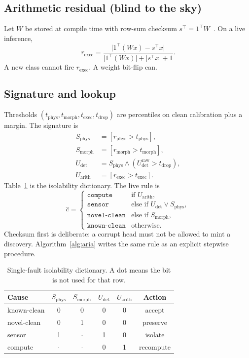 \documentclass[journal]{IEEEtran}
\begin{document}
\subsection{Arithmetic residual (blind to the sky)}
Let $W$ be stored at compile time with row-sum checksum $s^\top=1^\top W$~\cite{ftcnn2020}. On a live inference,
\[
r_{\mathrm{exec}}=\frac{\lvert 1^\top(Wx)-s^\top x\rvert}{\lvert 1^\top(Wx)\rvert+\lvert s^\top x\rvert+1}.
\]
A new class cannot fire $r_{\mathrm{exec}}$. A weight bit-flip can.

\subsection{Signature and lookup}
Thresholds $(t_{\mathrm{phys}},t_{\mathrm{morph}},t_{\mathrm{exec}},t_{\mathrm{drop}})$ are percentiles on clean calibration plus a margin. The signature is
\begin{align*}
S_{\mathrm{phys}} &= [r_{\mathrm{phys}}>t_{\mathrm{phys}}],\\
S_{\mathrm{morph}} &= [r_{\mathrm{morph}}>t_{\mathrm{morph}}],\\
U_{\mathrm{det}} &= S_{\mathrm{phys}}\wedge(U_{\mathrm{det}}^{\mathrm{raw}}>t_{\mathrm{drop}}),\\
U_{\mathrm{arith}} &= [r_{\mathrm{exec}}>t_{\mathrm{exec}}].
\end{align*}
Table~\ref{tab:dict} is the isolability dictionary. The live rule is
\begin{equation}
\hat{c}=\begin{cases}
\texttt{compute} & \text{if }U_{\mathrm{arith}},\\
\texttt{sensor} & \text{else if }U_{\mathrm{det}}\vee S_{\mathrm{phys}},\\
\texttt{novel-clean} & \text{else if }S_{\mathrm{morph}},\\
\texttt{known-clean} & \text{otherwise.}
\end{cases}
\label{eq:lookup}
\end{equation}
Checksum first is deliberate: a corrupt head must not be allowed to mint a discovery. Algorithm~\ref{alg:aria} writes the same rule as an explicit stepwise procedure.

\begin{table}[!t]
\caption{Single-fault isolability dictionary. A dot means the bit is not used for that row.}
\label{tab:dict}
\centering
\begin{tabular}{lccccc}
\toprule
Cause & $S_{\mathrm{phys}}$ & $S_{\mathrm{morph}}$ & $U_{\mathrm{det}}$ & $U_{\mathrm{arith}}$ & Action \\
\midrule
known-clean & 0 & 0 & 0 & 0 & accept \\
novel-clean & 0 & 1 & 0 & 0 & preserve \\
sensor & 1 & $\cdot$ & 1 & 0 & isolate \\
compute & $\cdot$ & $\cdot$ & 0 & 1 & recompute \\
\bottomrule
\end{tabular}
\end{table}
\end{document}
